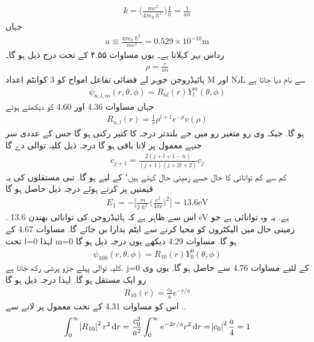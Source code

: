 \begin{align}
k=\big(\frac{me^{2}}{4\pi\epsilon_{0}\hslash^{2}}\big)\frac{1}{n}=\frac{1}{an} 
\end{align}
جہاں
\begin{align}
\boxed{a\equiv\frac{4\pi\epsilon_{0}\hslash^{2}}{me^{2}}=0.529\times 10^{-10}\text{m}} 
\end{align}
رداس بہر کہلاتا ہے۔ یوں مساوات ۴.۵۵ کے تحت درج ذیل ہو گا۔
\begin{align}
\rho=\frac{r}{an} 
\end{align}
ہائیڈروجن جوہر لے فضائی تفاعل  امواج کو 3 کوانٹم اعداد M اور N٫L سے نام دیا جاتا ہے 
 \begin{align}
\psi_{n,l,m}(r,\theta,\phi)=R_{nl}(r)Y_{l}^{m}(\theta,\phi) 
\end{align}
 جہاں مساوات 4.36 اور 4.60 کو دیکھتے ہوئے
 \begin{align}
R_{n,l}(r)=\frac{1}{r}\rho^{l+1}e^{-\rho}v(\rho) 
\end{align} 
 ہو گا. جبکہ وی رو متغير رو میں جے بلندتر
درجہ کا كثير رکنی ہو گا جس کے عددی سر جنہے معمول پر لانا باقی ہو گا  درجہ ذیل کلیہ توالی دے گا
 \begin{align}
c_{j+1}=\frac{2(j+l+1-n)}{(j+1)(j+2l+2)}c_{j} 
\end{align}
كم سے كم توانائی کا حال جسے زمینی حال کہتے ہیں٬ کے لیے
ہو گا. تبی مستقلوں کی یہ قیمتیں پر کرتے ہوئے درجہ ذیل حاصل ہو گا
 \begin{align}
\boxed{E_{1}=-\big[\frac{m}{2\hslash^{2}}\big(\frac{e^{2}}{4\pi\epsilon}\big)^{2}\big]=13.6\text{eV}} 
\end{align}
. اس سے ظاہر ہے کہ  ہائیڈروجن کی توانائی بھندن 13.6 eV ہے. یہ وہ توانائی ہے جو زمینی حال میں الیکٹرون کو محیا کرنے سے ایٹم بدارا بن جائے گا. مساوات 4.67 کے تحت l=0  لہذا m=0  ہو گا. مساوات 4.29 دیکھے یوں درجہ ذیل ہو گا
 \begin{align}
\psi_{100}(r,\theta,\phi)=R_{10}(r)Y_{0}^{0}(\theta,\phi) 
\end{align}
 کلیہ توالی پہلے جزو پرشی رکھ جاتا ہے. j=0 کے لئیے مساوات 4.76 سے
 حاصل ہو گا. یوں وی رو ایک مستقل 
  ہو گا. لہذا درجہ ذیل ہو گا
   \begin{align}
R_{10}(r)=\frac{c_{0}}{a}e^{-r/a} 
\end{align}
   اس کو مساوات 4.31 کے تحت معمول پر لانے
سے
..\begin{align}
\int_{0}^{\infty}\abs{R_{10}}^{2}r^{2}\dif{r}=\frac{c_{0}^{2}}{a^{2}}\int_{0}^{\infty}e^{-2r/a}r^{2}\dif{r}=\abs{c_{0}}^{2}\frac{a}{4}=1 
\end{align}
